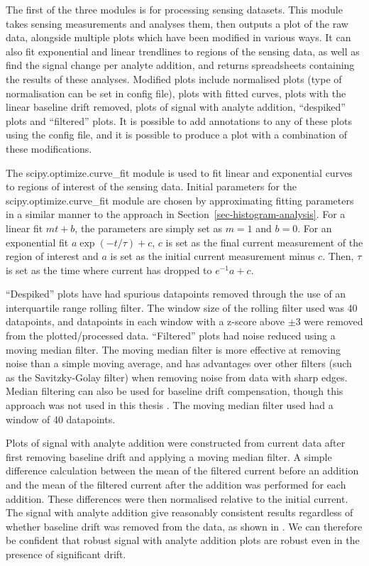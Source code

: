 \documentclass[
  a4paper,
]{scrbook}
\begin{document}
The first of the three modules is for processing sensing datasets. This
module takes sensing measurements and analyses them, then outputs a plot
of the raw data, alongside multiple plots which have been modified in
various ways. It can also fit exponential and linear trendlines to
regions of the sensing data, as well as find the signal change per
analyte addition, and returns spreadsheets containing the results of
these analyses. Modified plots include normalised plots (type of
normalisation can be set in config file), plots with fitted curves,
plots with the linear baseline drift removed, plots of signal with
analyte addition, ``despiked'' plots and ``filtered'' plots. It is
possible to add annotations to any of these plots using the config file,
and it is possible to produce a plot with a combination of these
modifications.

The scipy.optimize.curve\_fit module is used to fit linear and
exponential curves to regions of interest of the sensing data. Initial
parameters for the scipy.optimize.curve\_fit module are chosen by
approximating fitting parameters in a similar manner to the approach in
Section~\ref{sec-histogram-analysis}. For a linear fit \(mt + b\), the
parameters are simply set as \(m=1\) and \(b=0\). For an exponential fit
\(a\exp{(-t/\tau)} + c\), \(c\) is set as the final current measurement
of the region of interest and \(a\) is set as the initial current
measurement minus \(c\). Then, \(\tau\) is set as the time where current
has dropped to \(e^{-1}a + c\).

``Despiked'' plots have had spurious datapoints removed through the use
of an interquartile range rolling filter. The window size of the rolling
filter used was 40 datapoints, and datapoints in each window with a
z-score above \(\pm 3\) were removed from the plotted/processed data.
``Filtered'' plots had noise reduced using a moving median filter. The
moving median filter is more effective at removing noise than a simple
moving average, and has advantages over other filters (such as the
Savitzky-Golay filter) when removing noise from data with sharp edges.
Median filtering can also be used for baseline drift compensation,
though this approach was not used in this thesis \autocite{Stone2011}.
The moving median filter used had a window of 40 datapoints.

Plots of signal with analyte addition were constructed from current data
after first removing baseline drift and applying a moving median filter.
A simple difference calculation between the mean of the filtered current
before an addition and the mean of the filtered current after the
addition was performed for each addition. These differences were then
normalised relative to the initial current. The signal with analyte
addition give reasonably consistent results regardless of whether
baseline drift was removed from the data, as shown in \textcite{fig} .
We can therefore be confident that robust signal with analyte addition
plots are robust even in the presence of significant drift.
\end{document}
